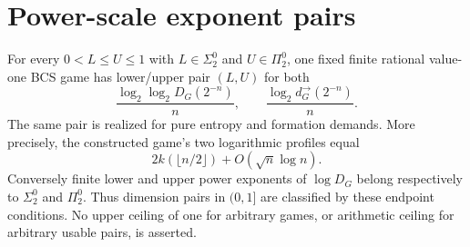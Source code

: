 \section{Power-scale exponent pairs}\label{sec:profile-power}
\begin{theorem}\label{thm:profile-power-pairs}
For every $0<L\le U\le1$ with $L\in\Sigma^0_2$ and $U\in\Pi^0_2$, one fixed finite rational value-one BCS game has lower/upper pair $(L,U)$ for both
\[
 \frac{\log_2\log_2D_G(2^{-n})}{n},\qquad
 \frac{\log_2d_G^\to(2^{-n})}{n}.
\]
The same pair is realized for pure entropy and formation demands. More precisely, the constructed game's two logarithmic profiles equal
\begin{equation}\label{eq:profile-power-law}
 2k(\lfloor n/2\rfloor)+O(\sqrt n\log n).
\end{equation}
Conversely finite lower and upper power exponents of $\log D_G$ belong respectively to $\Sigma^0_2$ and $\Pi^0_2$. Thus dimension pairs in $(0,1]$ are classified by these endpoint conditions. No upper ceiling of one for arbitrary games, or arithmetic ceiling for arbitrary usable pairs, is asserted.
\end{theorem}

